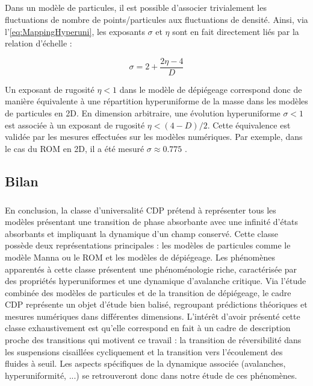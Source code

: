 \subparagraph{}Dans un modèle de particules, il est possible d'associer trivialement les fluctuations de nombre de points/particules aux fluctuations de densité. Ainsi, via l'\autoref{eq:MappingHyperuni}, les exposants $\sigma$ et $\eta$ sont en fait directement liés par la relation d'échelle :

\begin{equation}
	\sigma = 2 + \frac{2\eta - 4}{D}
	\label{eq:rel_eta_sigma}
\end{equation}

\noindent Un exposant de rugosité $\eta < 1$ dans le modèle de dépiégeage correspond donc de manière équivalente à une répartition hyperuniforme de la masse dans les modèles de particules en 2D. En dimension arbitraire, une évolution hyperuniforme $\sigma < 1$ est associée à un exposant de rugosité $\eta < (4-D)/2$. Cette équivalence est validée par les mesures effectuées sur les modèles numériques. Par exemple, dans le cas du ROM en 2D, il a été mesuré $\sigma \approx 0.775$ \cite{tjhung_hyperuniform_2015, hexner_hyperuniformity_2015, weijs_emergent_2015}.

\subsection{Bilan}

\subparagraph{}En conclusion, la classe d'universalité CDP prétend à représenter tous les modèles présentant une transition de phase absorbante avec une infinité d'états absorbants et impliquant la dynamique d'un champ conservé. Cette classe possède deux représentations principales : les modèles de particules comme le modèle Manna ou le ROM et les modèles de dépiégeage. Les phénomènes apparentés à cette classe présentent une phénoménologie riche, caractérisée par des propriétés hyperuniformes et une dynamique d'avalanche critique. Via l'étude combinée des modèles de particules et de la transition de dépiégeage, le cadre CDP représente un objet d'étude bien balisé, regroupant prédictions théoriques et mesures numériques dans différentes dimensions. L'intérêt d'avoir présenté cette classe exhaustivement est qu'elle correspond en fait à un cadre de description proche des transitions qui motivent ce travail : la transition de réversibilité dans les suspensions cisaillées cycliquement et la transition vers l'écoulement des fluides à seuil. Les aspects spécifiques de la dynamique associée (avalanches, hyperuniformité, ...) se retrouveront donc dans notre étude de ces phénomènes.

